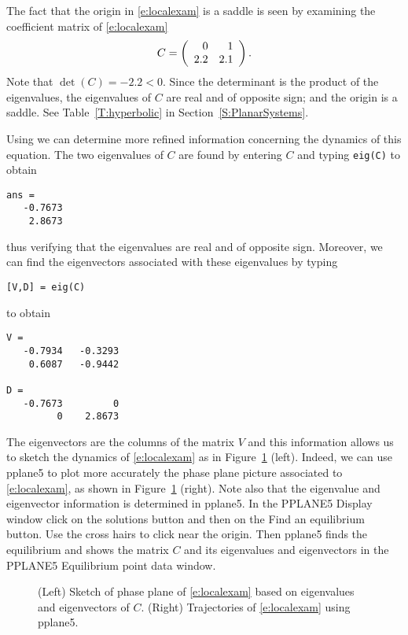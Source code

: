 \documentclass{ximera}
\begin{document}
The fact that the origin in \eqref{e:localexam} is a saddle is seen by 
examining the coefficient matrix of \eqref{e:localexam}
\[
C = \left(\begin{array}{rr} 0 & 1\\ 2.2 &2.1\end{array}\right).
\]
Note that $\det(C)=-2.2<0$.  Since the determinant is the product 
of the eigenvalues, the eigenvalues of $C$ are real and of opposite 
sign; and the origin is a saddle.  See Table~\ref{T:hyperbolic} in 
Section~\ref{S:PlanarSystems}.

Using \Matlab we can determine more refined information
concerning the dynamics of this equation.  The two eigenvalues
of $C$ are found by entering $C$ and typing {\tt eig(C)}
to obtain
\begin{verbatim}
ans = 
   -0.7673
    2.8673
\end{verbatim}
thus verifying that the eigenvalues are real and of opposite
sign.  Moreover, we can find the eigenvectors
 associated with these eigenvalues by typing
\begin{verbatim}
[V,D] = eig(C)
\end{verbatim}
to obtain
\begin{verbatim}
V = 
   -0.7934   -0.3293
    0.6087   -0.9442
 
D =
   -0.7673         0
         0    2.8673
\end{verbatim} 
The eigenvectors are the columns of the matrix $V$ and this 
information allows us to sketch the dynamics of
\eqref{e:localexam} as in Figure~\ref{F:local} (left).  Indeed, we
can use {\sf pplane5} to plot more accurately the phase plane
picture associated to \eqref{e:localexam}, as shown in
Figure~\ref{F:local} (right).  Note also that the eigenvalue and eigenvector
information is determined in {\sf pplane5}.  In the {\sf PPLANE5 Display}
window click on the {\sf solutions} button and then on the {\sf Find an 
equilibrium} button.  Use the cross hairs to click near the origin.  Then 
{\sf pplane5} finds the equilibrium and shows the matrix $C$ and its eigenvalues
and eigenvectors in the {\sf PPLANE5 Equilibrium point data} window.

\begin{figure}[htb]
           \centerline{%
           }
           \caption{(Left) Sketch of phase plane of \protect\eqref{e:localexam} 
	based on eigenvalues and eigenvectors of $C$. (Right) Trajectories 
	of \protect\eqref{e:localexam} using {\sf pplane5}.}
           \label{F:local}
\end{figure}
\end{document}
